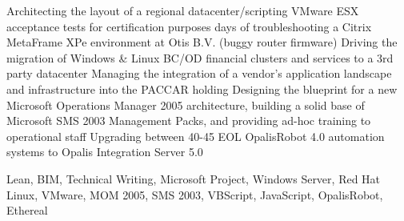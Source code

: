\begin{experiences}
{\begin{itemize}
                        \linebreak Architecting the layout of a regional datacenter/scripting VMware ESX acceptance tests for certification purposes
                         days of troubleshooting a Citrix MetaFrame XPe environment at Otis B.V. (buggy router firmware)
                        \linebreak Driving the migration of Windows \& Linux BC/OD financial clusters and services to a 3rd party datacenter
                        \linebreak Managing the integration of a vendor's application landscape and infrastructure into the PACCAR holding
                        \linebreak Designing the blueprint for a new Microsoft Operations Manager 2005 architecture, building a solid base of Microsoft SMS 2003 Management Packs, and providing ad-hoc training to operational staff
                        \linebreak Upgrading between 40-45 EOL OpalisRobot 4.0 automation systems to Opalis Integration Server 5.0
                      \end{itemize}
                    }
                    {Lean, BIM, Technical Writing, Microsoft Project, Windows Server, Red Hat Linux, VMware, MOM 2005, SMS 2003, VBScript, JavaScript, OpalisRobot, Ethereal}
\end{experiences}
